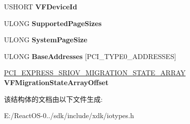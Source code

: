 \begin{DoxyCompactItemize}
U\+S\+H\+O\+RT {\bfseries V\+F\+Device\+Id}
\item 
\mbox{\label{struct___p_c_i___e_x_p_r_e_s_s___s_r_i_o_v___c_a_p_a_b_i_l_i_t_y_affd97cafa3916f9013ec25d17b7b09de}} 
U\+L\+O\+NG {\bfseries Supported\+Page\+Sizes}
\item 
\mbox{\label{struct___p_c_i___e_x_p_r_e_s_s___s_r_i_o_v___c_a_p_a_b_i_l_i_t_y_aad1fca2cc27dc7cfe20184c57187439e}} 
U\+L\+O\+NG {\bfseries System\+Page\+Size}
\item 
\mbox{\label{struct___p_c_i___e_x_p_r_e_s_s___s_r_i_o_v___c_a_p_a_b_i_l_i_t_y_a58c79af1778ee823ea3462ad08870761}} 
U\+L\+O\+NG {\bfseries Base\+Addresses} \mbox{[}P\+C\+I\+\_\+\+T\+Y\+P\+E0\+\_\+\+A\+D\+D\+R\+E\+S\+S\+ES\mbox{]}
\item 
\mbox{\label{struct___p_c_i___e_x_p_r_e_s_s___s_r_i_o_v___c_a_p_a_b_i_l_i_t_y_a21d56dfaea08cc2e5e610f4a20d5e01e}} 
\hyperlink{union___p_c_i___e_x_p_r_e_s_s___s_r_i_o_v___m_i_g_r_a_t_i_o_n___s_t_a_t_e___a_r_r_a_y}{P\+C\+I\+\_\+\+E\+X\+P\+R\+E\+S\+S\+\_\+\+S\+R\+I\+O\+V\+\_\+\+M\+I\+G\+R\+A\+T\+I\+O\+N\+\_\+\+S\+T\+A\+T\+E\+\_\+\+A\+R\+R\+AY} {\bfseries V\+F\+Migration\+State\+Array\+Offset}
\end{DoxyCompactItemize}


该结构体的文档由以下文件生成\+:\begin{DoxyCompactItemize}
\item 
E\+:/\+React\+O\+S-\/0../sdk/include/xdk/iotypes.\+h\end{DoxyCompactItemize}
